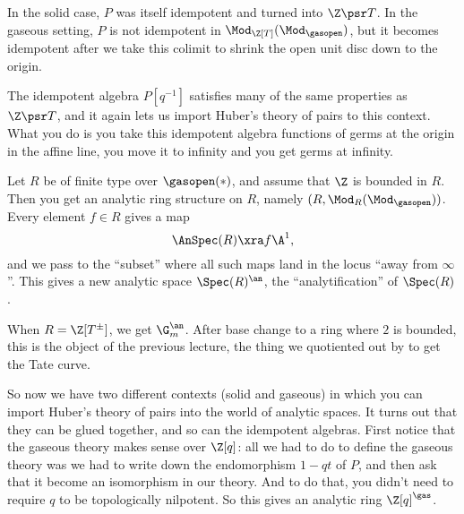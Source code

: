 In the solid case, $P$ was itself idempotent and turned into $\Z\psr T$. In the gaseous setting, $P$ is not idempotent in $\Mod_{\Z[T]}(\Mod_{\gasopen})$, but it becomes idempotent after we take this colimit to shrink the open unit disc down to the origin.



The idempotent algebra $P[q^{-1}]$ satisfies many of the same properties as $\Z\psr T$, and it again lets us import Huber's theory of pairs to this context. What you do is you take this idempotent algebra functions of germs at the origin in the affine line, you move it to infinity and you get germs at infinity.

Let $R$ be of finite type over $\gasopen(*)$, and assume that $\Z$ is bounded in $R$. Then you get an analytic ring structure on $R$, namely $(R,\Mod_R(\Mod_{\gasopen}))$. Every element $f\in R$ gives a map
\[ \AnSpec(R)\xra f\A^1, \]
and we pass to the ``subset'' where all such maps land in the locus ``away from $\infty$''. This gives a new analytic space $\Spec(R)^\an$, the ``analytification'' of $\Spec(R)$.

\begin{example}
  When $R=\Z[T^\pm]$, we get $\G_m^\an$. After base change to a ring where $2$ is bounded, this is the object of the previous lecture, the thing we quotiented out by to get the Tate curve.
\end{example}

So now we have two different contexts (solid and gaseous) in which you can import Huber's theory of pairs into the world of analytic spaces. It turns out that they can be glued together, and so can the idempotent algebras. First notice that the gaseous theory makes sense over $\Z[q]$: all we had to do to define the gaseous theory was we had to write down the endomorphism $1-qt$ of $P$, and then ask that it become an isomorphism in our theory. And to do that, you didn't need to require $q$ to be topologically nilpotent. So this gives an analytic ring $\Z[q]^\gas$.


